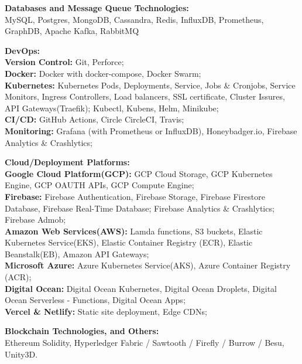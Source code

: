 \documentclass{article}
\begin{document}
\noindent \normalsize \textbf{Databases and Message Queue Technologies:} \\
\noindent \normalsize MySQL, Postgres, MongoDB, Cassandra, Redis, InfluxDB, Prometheus, GraphDB, Apache Kafka, RabbitMQ
\vspace{3pt}

\noindent \normalsize \textbf{DevOps:} \\
\textbf{Version Control:} Git, Perforce;\\
\textbf{Docker:} Docker with docker-compose, Docker Swarm;\\
\textbf{Kubernetes:} Kubernetes Pods, Deployments, Service, Jobs \& Cronjobs, Service Monitors, Ingress Controllers, Load balancers, SSL certificate, Cluster Issures, API Gateways(Traefik); Kubectl, Kubens, Helm, Minikube;\\
\textbf{CI/CD:} GitHub Actions, Circle CircleCI, Travis;\\
\textbf{Monitoring:} Grafana (with Prometheus or InfluxDB), Honeybadger.io,  Firebase Analytics \& Crashlytics;
\vspace{3pt}

\noindent \normalsize \textbf{Cloud/Deployment Platforms:}\\
\textbf{Google Cloud Platform(GCP):} GCP Cloud Storage, GCP Kubernetes Engine, GCP OAUTH APIs, GCP Compute Engine;\\
\textbf{Firebase:} Firebase Authentication, Firebase Storage, Firebase Firestore Database, Firebase Real-Time Database; Firebase Analytics \& Crashlytics; Firebase Admob;\\
\textbf{Amazon Web Services(AWS):} Lamda functions, S3 buckets, Elastic Kubernetes Service(EKS), Elastic Container Registry (ECR), Elastic Beanstalk(EB), Amazon API Gateways;\\
\textbf{Microsoft Azure:} Azure Kubernetes Service(AKS), Azure Container Registry (ACR);\\
\textbf{Digital Ocean:} Digital Ocean Kubernetes, Digital Ocean Droplets, Digital Ocean Serverless - Functions, Digital Ocean Apps;\\
\textbf{Vercel \& Netlify:} Static site deployment, Edge CDNs;  
\vspace{3pt}

\noindent \normalsize \textbf{Blockchain Technologies, and Others:}\\
\noindent \normalsize Ethereum Solidity, Hyperledger Fabric / Sawtooth / Firefly / Burrow / Besu, Unity3D.
\end{document}
